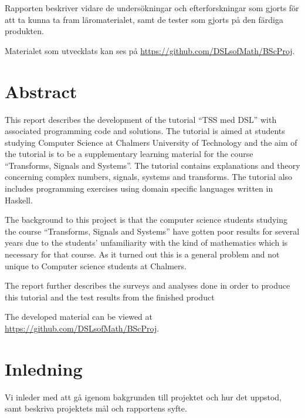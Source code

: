 \documentclass[12pt,a4paper,twoside,openright]{article}
\begin{document}
Rapporten beskriver vidare de undersökningar och efterforskningar som gjorts
för att ta kunna ta fram läromaterialet, samt de tester som gjorts på den
färdiga produkten.

Materialet som utvecklats kan ses på \url{https://github.com/DSLsofMath/BScProj}.

\newpage

\thispagestyle{plain}

\section*{Abstract}
This report describes the development of the tutorial ``TSS med DSL'' with
associated programming code and solutions. The tutorial is aimed at students
studying Computer Science at Chalmers University of Technology and the aim of
the tutorial is to be a supplementary learning material for the course
``Transforms, Signals and Systems''. The tutorial contains explanations and
theory concerning complex numbers, signals, systems and transforms. The
tutorial also includes programming exercises using domain specific languages
written in Haskell.

The background to this project is that the computer science students studying
the course ``Transforms, Signals and Systems'' have gotten poor results for
several years due to the students' unfamiliarity with the kind of mathematics
which is necessary for that course. As it turned out this is a general problem
and not unique to Computer science students at Chalmers.

The report further describes the surveys and analyses done in order to produce
this tutorial and the test results from the finished product

The developed material can be viewed at \url{https://github.com/DSLsofMath/BScProj}.

\newpage

\tableofcontents

\newpage

\printglossary[title=Ordlista,nonumberlist]

\newpage

\setcounter{page}{1}
\setlength{\parskip}{2mm plus2mm}

\section{Inledning}
Vi inleder med att gå igenom bakgrunden till projektet och hur det
uppstod, samt beskriva projektets mål och rapportens syfte.
\end{document}
